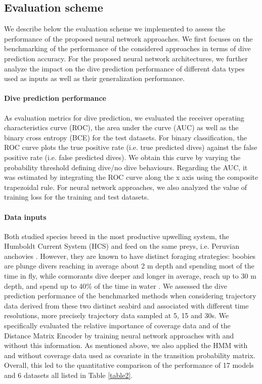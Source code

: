 \documentclass{article}
\begin{document}
\subsection{Evaluation scheme}
We describe below the evaluation scheme we implemented to assess the performance of the proposed neural network approaches. We first focuses on the benchmarking of the performance of the considered approaches in terms of dive prediction accuracy. For the proposed neural network architectures, we further analyze the impact on the dive prediction performance of different data types used as inputs as well as their generalization performance.

\paragraph{Dive prediction performance}
As evaluation metrics for dive prediction, we evaluated the receiver operating characteristics curve (ROC), the area under the curve (AUC) as well as the binary cross entropy (BCE) for the test datasets.
For binary classification, the ROC curve plots the true positive rate (i.e. true predicted dives) against the false positive rate (i.e. false predicted dives). We obtain this curve by varying the probability threshold defining dive/no dive behaviours. Regarding the AUC, it was estimated by integrating the ROC curve along the x axis using the composite trapezoidal rule. For neural network approaches, we also analyzed the value of training loss for the training and test datasets.

\paragraph{Data inputs}
Both studied species breed in the most productive upwelling system, the Humboldt Current System (HCS) and feed on the same preys, i.e. Peruvian anchovies \citep{jahncke_diets_1998}. However, they are known to have distinct foraging strategies: boobies are plunge divers reaching in average about 2 m depth and spending most of the time in fly, while cormorants dive deeper and longer in average, reach up to 30 m depth, and spend up to 40\% of the time in water \citep{weimerskirch_foraging_2012}.
We assessed the dive prediction performance of the benchmarked methods when considering trajectory data derived from these two distinct seabird and associated with different time resolutions, more precisely trajectory data sampled at 5, 15 and 30s.
We specifically evaluated the relative importance of coverage data and of the Distance Matrix Encoder by training neural network approaches with and without this information. As mentioned above, we also applied the HMM with and without coverage data used as covariate in the transition probability matrix.
Overall, this led to the quantitative comparison of the performance of 17 models and 6 datasets all listed in Table \ref{table2}.
\end{document}
